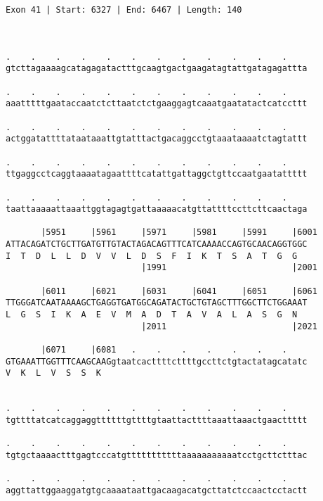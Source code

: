 \documentclass{article}
\begin{document}
\begin{Verbatim}
Exon 41 | Start: 6327 | End: 6467 | Length: 140



.    .    .    .    .    .    .    .    .    .    .    .    
gtcttagaaaagcatagagatactttgcaagtgactgaagatagtattgatagagattta
                                                            
.    .    .    .    .    .    .    .    .    .    .    .    
aaatttttgaataccaatctcttaatctctgaaggagtcaaatgaatatactcatccttt
                                                            
.    .    .    .    .    .    .    .    .    .    .    .    
actggatattttataataaattgtatttactgacaggcctgtaaataaaatctagtattt
                                                            
.    .    .    .    .    .    .    .    .    .    .    .    
ttgaggcctcaggtaaaatagaattttcatattgattaggctgttccaatgaatattttt
                                                            
.    .    .    .    .    .    .    .    .    .    .    .    
taattaaaaattaaattggtagagtgattaaaaacatgttattttccttcttcaactaga
                                                            
       |5951     |5961     |5971     |5981     |5991     |6001
ATTACAGATCTGCTTGATGTTGTACTAGACAGTTTCATCAAAACCAGTGCAACAGGTGGC
I  T  D  L  L  D  V  V  L  D  S  F  I  K  T  S  A  T  G  G  
                           |1991                         |2001
  
       |6011     |6021     |6031     |6041     |6051     |6061
TTGGGATCAATAAAAGCTGAGGTGATGGCAGATACTGCTGTAGCTTTGGCTTCTGGAAAT
L  G  S  I  K  A  E  V  M  A  D  T  A  V  A  L  A  S  G  N  
                           |2011                         |2021
  
       |6071     |6081   .    .    .    .    .    .    .    
GTGAAATTGGTTTCAAGCAAGgtaatcacttttcttttgccttctgtactatagcatatc
V  K  L  V  S  S  K                                         
                                                            
  
.    .    .    .    .    .    .    .    .    .    .    .    
tgttttatcatcaggaggttttttgttttgtaattacttttaaattaaactgaacttttt
                                                            
.    .    .    .    .    .    .    .    .    .    .    .    
tgtgctaaaactttgagtcccatgtttttttttttaaaaaaaaaaatcctgcttctttac
                                                            
.    .    .    .    .    .    .    .    .    .    .    .    
aggttattggaaggatgtgcaaaataattgacaagacatgcttatctccaactcctactt
                                                            

\end{Verbatim}
\end{document}
